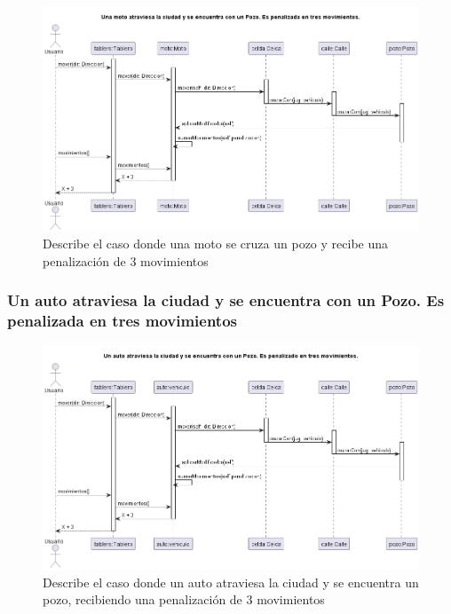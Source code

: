 \documentclass[titlepage,a4paper]{article}
\begin{document}
\begin{figure}[H]
  \centering
  \includegraphics[width=1\textwidth]{diagramas/SecuenciaUnaMotoCruzaUnPozoYEsPenalizado.png}
  \caption{\label{fig:class01}Describe el caso donde una moto se cruza un pozo y recibe una penalización de 3 movimientos}
\end{figure}

\subsubsection[Un auto atraviesa la ciudad y se encuentra con un Pozo. Es penalizada en tres movimientos]{Un auto atraviesa la ciudad y se encuentra con un Pozo. Es penalizada en tres movimientos}

\begin{figure}[H]
  \centering
  \includegraphics[width=1\textwidth]{diagramas/SecuenciaAutoCruzaUnPozoYEsPenalizado.png}
  \caption{\label{fig:class01} Describe el caso donde un auto atraviesa la ciudad y se encuentra un pozo, recibiendo una penalización de 3 movimientos}
\end{figure}
\end{document}
